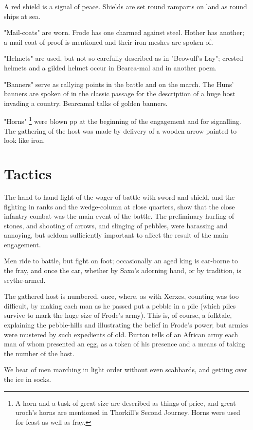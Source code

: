 \documentclass[10pt,a4paper]{report}
\begin{document}
A red shield is a signal of peace. Shields are set round ramparts on land as round ships at sea.

"Mail-coats" are worn. Frode has one charmed against steel. Hother has another; a mail-coat of proof is mentioned and their iron meshes are spoken of.

"Helmets" are used, but not so carefully described as in "Beowulf's Lay"; crested helmets and a gilded helmet occur in Bearca-mal and in another poem.

"Banners" serve as rallying points in the battle and on the march. The Huns' banners are spoken of in the classic passage for the description of a huge host invading a country. Bearcamal talks of golden banners.

"Horns" \footnote{A horn and a tusk of great size are described as things of price, and great uroch's horns are mentioned in Thorkill's Second Journey.  Horns were used for feast as well as fray.} were blown pp at the beginning of the engagement and for signalling. The gathering of the host was made by delivery of a wooden arrow painted to look like iron.

\section{Tactics}
The hand-to-hand fight of the wager of battle with sword and shield, and the fighting in ranks and the wedge-column at close quarters, show that the close infantry combat was the main event of the battle. The preliminary hurling of stones, and shooting of arrows, and slinging of pebbles, were harassing and annoying, but seldom sufficiently important to affect the result of the main engagement.

Men ride to battle, but fight on foot; occasionally an aged king is car-borne to the fray, and once the car, whether by Saxo's adorning hand, or by tradition, is scythe-armed.

The gathered host is numbered, once, where, as with Xerxes, counting was too difficult, by making each man as he passed put a pebble in a pile (which piles survive to mark the huge size of Frode's army). This is, of course, a folktale, explaining the pebble-hills and illustrating the belief in Frode's power; but armies were mustered by such expedients of old. Burton tells of an African army each man of whom presented an egg, as a token of his presence and a means of taking the number of the host.

We hear of men marching in light order without even scabbards, and getting over the ice in socks.
\end{document}
